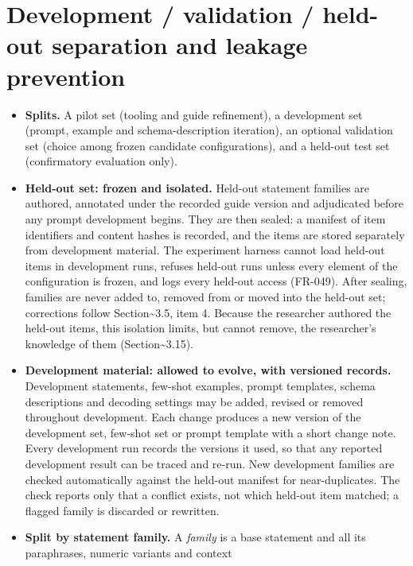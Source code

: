 \documentclass[
  11pt,a4paper,oneside]{report}
\providecommand{\tightlist}{%
  \setlength{\itemsep}{0pt}\setlength{\parskip}{0pt}}
\begin{document}
\hypertarget{development--validation--held-out-separation-and-leakage-prevention}{%
\section{Development / validation / held-out separation and leakage
prevention}\label{development--validation--held-out-separation-and-leakage-prevention}}

\begin{itemize}
\tightlist
\item
  \textbf{Splits.} A pilot set (tooling and guide refinement), a
  development set (prompt, example and schema-description iteration), an
  optional validation set (choice among frozen candidate configurations),
  and a held-out test set (confirmatory evaluation only).
\item
  \textbf{Held-out set: frozen and isolated.} Held-out statement families
  are authored, annotated under the recorded guide version and adjudicated
  before any prompt development begins. They are then sealed: a manifest
  of item identifiers and content hashes is recorded, and the items are
  stored separately from development material. The experiment harness
  cannot load held-out items in development runs, refuses held-out runs
  unless every element of the configuration is frozen, and logs every
  held-out access (FR-049). After sealing, families are never added to,
  removed from or moved into the held-out set; corrections follow
  Section\textasciitilde3.5, item 4. Because the researcher authored the
  held-out items, this isolation limits, but cannot remove, the
  researcher's knowledge of them (Section\textasciitilde3.15).
\item
  \textbf{Development material: allowed to evolve, with versioned
  records.} Development statements, few-shot examples, prompt templates,
  schema descriptions and decoding settings may be added, revised or
  removed throughout development. Each change produces a new version of
  the development set, few-shot set or prompt template with a short change
  note. Every development run records the versions it used, so that any
  reported development result can be traced and re-run. New development
  families are checked automatically against the held-out manifest for
  near-duplicates. The check reports only that a conflict exists, not
  which held-out item matched; a flagged family is discarded or rewritten.
\item
  \textbf{Split by statement family.} A \emph{family} is a base
  statement and all its paraphrases, numeric variants and context

\end{itemize}
\end{document}
